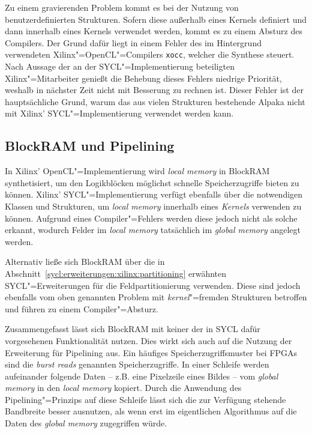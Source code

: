 Zu einem gravierenden Problem kommt es bei der Nutzung von benutzerdefinierten
Strukturen. Sofern diese außerhalb eines Kernels definiert und dann innerhalb
eines Kernels verwendet werden, kommt es zu einem Absturz des Compilers. Der
Grund dafür liegt in einem Fehler des im Hintergrund verwendeten
Xilinx"=OpenCL"=Compilers \texttt{xocc}, welcher die Synthese steuert. Nach
Aussage der an der SYCL"=Implementierung beteiligten Xilinx"=Mitarbeiter genießt
die Behebung dieses Fehlers niedrige Priorität, weshalb in nächster Zeit nicht
mit Besserung zu rechnen ist. Dieser Fehler ist der hauptsächliche Grund, warum
das aus vielen Strukturen bestehende Alpaka nicht mit Xilinx'
SYCL"=Implementierung verwendet werden kann.

\subsection{BlockRAM und Pipelining}

In Xilinx' OpenCL"=Implementierung wird \textit{local memory} in BlockRAM
synthetisiert, um den Logikblöcken möglichst schnelle Speicherzugriffe bieten zu
können. Xilinx' SYCL"=Implementierung verfügt ebenfalls über die notwendigen
Klassen und Strukturen, um \textit{local memory} innerhalb eines
\textit{Kernels} verwenden zu können. Aufgrund eines Compiler"=Fehlers werden
diese jedoch nicht als solche erkannt, wodurch Felder im \textit{local memory}
tatsächlich im \textit{global memory} angelegt werden.

Alternativ ließe sich BlockRAM über die in
Abschnitt~\ref{sycl:erweiterungen:xilinx:partitioning} erwähnten
SYCL"=Erweiterungen für die Feldpartitionierung verwenden. Diese sind jedoch
ebenfalls vom oben genannten Problem mit \textit{kernel}"=fremden Strukturen
betroffen und führen zu einem Compiler"=Absturz.

Zusammengefasst lässt sich BlockRAM mit keiner der in SYCL dafür vorgesehenen
Funktionalität nutzen. Dies wirkt sich auch auf die Nutzung der Erweiterung
für Pipelining aus. Ein häufiges Speicherzugriffsmuster bei FPGAs sind die
\textit{burst reads} genannten Speicherzugriffe. In einer Schleife werden
aufeinander folgende Daten -- z.B. eine Pixelzeile eines Bildes -- vom
\textit{global memory} in den \textit{local memory} kopiert. Durch die Anwendung
des Pipelining"=Prinzips auf diese Schleife lässt sich die zur Verfügung
stehende Bandbreite besser ausnutzen, als wenn erst im eigentlichen Algorithmus
auf die Daten des \textit{global memory} zugegriffen würde.

